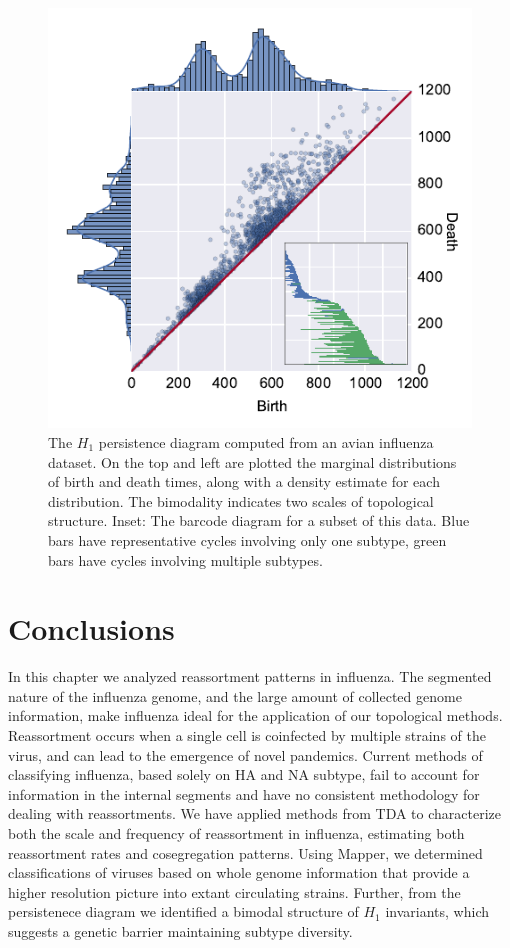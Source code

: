 \begin{figure}
\centering
\includegraphics[width=\columnwidth]{./fig/influenza/flu_scatterplot.pdf}
\caption[$H_1$ persistence diagram computed from an avian influenza dataset.]{The $H_1$ persistence diagram computed from an avian influenza dataset. On the top and left are plotted the marginal distributions of birth and death times, along with a density estimate for each distribution. The bimodality indicates two scales of topological structure. Inset: The barcode diagram for a subset of this data. Blue bars have representative cycles involving only one subtype, green bars have cycles involving multiple subtypes.}
\label{fig:flu:scatterplot}
\end{figure}

\section{Conclusions}
\label{flu:conclusions}

In this chapter we analyzed reassortment patterns in influenza.
The segmented nature of the influenza genome, and the large amount of collected genome information, make influenza ideal for the application of our topological methods.
Reassortment occurs when a single cell is coinfected by multiple strains of the virus, and can lead to the emergence of novel pandemics.
Current methods of classifying influenza, based solely on HA and NA subtype, fail to account for information in the internal segments and have no consistent methodology for dealing with reassortments.
We have applied methods from TDA to characterize both the scale and frequency of reassortment in influenza, estimating both reassortment rates and cosegregation patterns.
Using Mapper, we determined classifications of viruses based on whole genome information that provide a higher resolution picture into extant circulating strains.
Further, from the persistenece diagram we identified a bimodal structure of $H_1$ invariants, which suggests a genetic barrier maintaining subtype diversity.